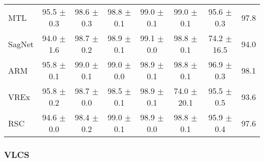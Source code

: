 \documentclass{article}
\begin{document}
\begin{center}
{\begin{tabular}{lccccccc}
MTL                  & 95.5 $\pm$ 0.3       & 98.6 $\pm$ 0.3       & 98.8 $\pm$ 0.1       & 99.0 $\pm$ 0.1       & 99.0 $\pm$ 0.1       & 95.6 $\pm$ 0.3       & 97.8                 \\
SagNet               & 94.0 $\pm$ 1.6       & 98.7 $\pm$ 0.2       & 98.9 $\pm$ 0.1       & 99.1 $\pm$ 0.0       & 98.8 $\pm$ 0.1       & 74.2 $\pm$ 16.5      & 94.0                 \\
ARM                  & 95.8 $\pm$ 0.1       & 99.0 $\pm$ 0.1       & 99.0 $\pm$ 0.0       & 98.9 $\pm$ 0.1       & 98.8 $\pm$ 0.1       & 96.9 $\pm$ 0.3       & 98.1                 \\
VREx                 & 95.8 $\pm$ 0.2       & 98.7 $\pm$ 0.0       & 98.5 $\pm$ 0.1       & 98.9 $\pm$ 0.1       & 74.0 $\pm$ 20.1      & 95.5 $\pm$ 0.5       & 93.6                 \\
RSC                  & 94.6 $\pm$ 0.0       & 98.4 $\pm$ 0.2       & 99.0 $\pm$ 0.1       & 98.9 $\pm$ 0.0       & 98.8 $\pm$ 0.1       & 95.9 $\pm$ 0.4       & 97.6                 \\
\bottomrule
\end{tabular}}
\end{center}

\subsubsection{VLCS}
\end{document}
